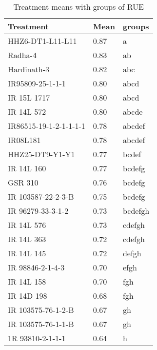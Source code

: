 \documentclass[]{article}
\begin{document}
\begin{longtable}{lll}
\caption{\label{tab:two-fac-groups-tab-agroclimate-early}Treatment means with groups of RUE}\\
\toprule
Treatment & Mean & groups\\
\midrule
\rowcolor{gray!6}  HHZ6-DT1-L11-L11 & 0.87 & a\\
Radha-4 & 0.83 & ab\\
\rowcolor{gray!6}  Hardinath-3 & 0.82 & abc\\
IR95809-25-1-1-1 & 0.80 & abcd\\
\rowcolor{gray!6}  IR 15L 1717 & 0.80 & abcd\\
\addlinespace
IR 14L 572 & 0.80 & abcde\\
\rowcolor{gray!6}  IR86515-19-1-2-1-1-1-1 & 0.78 & abcdef\\
IR08L181 & 0.78 & abcdef\\
\rowcolor{gray!6}  HHZ25-DT9-Y1-Y1 & 0.77 & bcdef\\
IR 14L 160 & 0.77 & bcdefg\\
\addlinespace
\rowcolor{gray!6}  GSR 310 & 0.76 & bcdefg\\
IR 103587-22-2-3-B & 0.75 & bcdefg\\
\rowcolor{gray!6}  IR 96279-33-3-1-2 & 0.73 & bcdefgh\\
IR 14L 576 & 0.73 & cdefgh\\
\rowcolor{gray!6}  IR 14L 363 & 0.72 & cdefgh\\
\addlinespace
IR 14L 145 & 0.72 & defgh\\
\rowcolor{gray!6}  IR 98846-2-1-4-3 & 0.70 & efgh\\
IR 14L 158 & 0.70 & fgh\\
\rowcolor{gray!6}  IR 14D 198 & 0.68 & fgh\\
IR 103575-76-1-2-B & 0.67 & gh\\
\addlinespace
\rowcolor{gray!6}  IR 103575-76-1-1-B & 0.67 & gh\\
1R 93810-2-1-1-1 & 0.64 & h\\
\bottomrule
\end{longtable}
\endgroup{}

\begingroup\fontsize{12}{14}\selectfont
\end{document}
